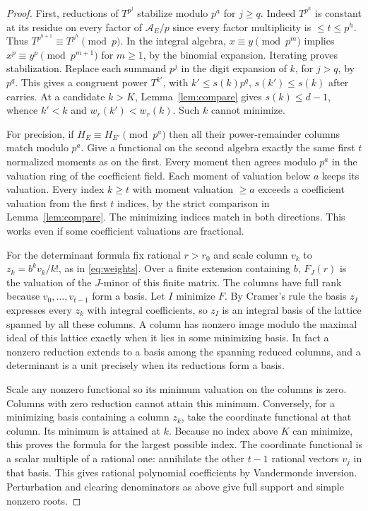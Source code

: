 \documentclass[11pt,letterpaper]{article}
\begin{document}
\begin{proof}
First, reductions of $T^{p^j}$ stabilize modulo $p^a$ for $j\ge q$. Indeed $T^{p^h}$ is constant at its residue on every factor of $\mathcal A_E/p$ since every factor multiplicity is $\le t\le p^h$. Thus $T^{p^{h+1}}\equiv T^{p^h}\pmod p$. In the integral algebra, $x\equiv y\pmod{p^m}$ implies $x^p\equiv y^p\pmod{p^{m+1}}$ for $m\ge1$, by the binomial expansion. Iterating proves stabilization. Replace each summand $p^j$ in the digit expansion of $k$, for $j>q$, by $p^q$. This gives a congruent power $T^{k'}$, with $k'\le s(k)p^q$, $s(k')\le s(k)$ after carries. At a candidate $k>K$, Lemma~\ref{lem:compare} gives $s(k)\le d-1$, whence $k'<k$ and $w_r(k')<w_r(k)$. Such $k$ cannot minimize.

For precision, if $H_E\equiv H_{E'}\pmod{p^a}$ then all their power-remainder columns match modulo $p^a$. Give a functional on the second algebra exactly the same first $t$ normalized moments as on the first. Every moment then agrees modulo $p^a$ in the valuation ring of the coefficient field. Each moment of valuation below $a$ keeps its valuation. Every index $k\ge t$ with moment valuation $\ge a$ exceeds a coefficient valuation from the first $t$ indices, by the strict comparison in Lemma~\ref{lem:compare}. The minimizing indices match in both directions. This works even if some coefficient valuations are fractional.

For the determinant formula fix rational $r>r_0$ and scale column $v_k$ to $z_k=b^kv_k/k!$, as in \eqref{eq:weights}. Over a finite extension containing $b$, $F_J(r)$ is the valuation of the $J$-minor of this finite matrix. The columns have full rank because $v_0,\ldots,v_{t-1}$ form a basis. Let $I$ minimize $F$. By Cramer's rule the basis $z_I$ expresses every $z_k$ with integral coefficients, so $z_I$ is an integral basis of the lattice spanned by all these columns. A column has nonzero image modulo the maximal ideal of this lattice exactly when it lies in some minimizing basis. In fact a nonzero reduction extends to a basis among the spanning reduced columns, and a determinant is a unit precisely when its reductions form a basis.

Scale any nonzero functional so its minimum valuation on the columns is zero. Columns with zero reduction cannot attain this minimum. Conversely, for a minimizing basis containing a column $z_k$, take the coordinate functional at that column. Its minimum is attained at $k$. Because no index above $K$ can minimize, this proves the formula for the largest possible index. The coordinate functional is a scalar multiple of a rational one: annihilate the other $t-1$ rational vectors $v_j$ in that basis. This gives rational polynomial coefficients by Vandermonde inversion. Perturbation and clearing denominators as above give full support and simple nonzero roots.


\end{proof}
\end{document}
